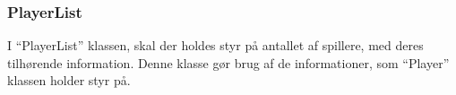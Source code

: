 \subsubsection{PlayerList}
I “PlayerList” klassen, skal der holdes styr på antallet af spillere, med deres tilhørende information. Denne klasse gør brug af de informationer, som “Player” klassen holder styr på.